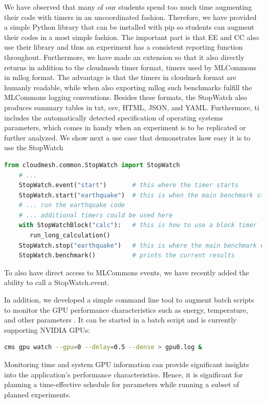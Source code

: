 \documentclass[utf8]{FrontiersinVancouver} %
\begin{document}
We have observed that many of our students spend too much time augmenting their code with timers in an uncoordinated fashion. Therefore, we have provided a simple Python library that can be installed with pip so students can augment their codes in a most simple fashion. The important part is that EE and CC also use their library and thus an experiment has a consistent reporting function throughout.  Furthermore, we have made an extension so that it also directly returns in addition to the cloudmesh timer format, timers used by MLCommons in mllog format. The advantage is that the timers in cloudmeh format are humanly readable, while when also exporting mllog such benchmarks fulfill the MLCommons logging conventions. Besides these formats, the StopWatch also produces summary tables in txt, csv, HTML, JSON, and YAML. Furthermore, ti includes the automatically detected specification of operating systems parameters, which comes in handy when an experiment is to be replicated or further analyzed.
We show next  a use case that demonstrates how easy it is to use the StopWatch


\begin{lstlisting}[language=Python]
    from cloudmesh.common.StopWatch import StopWatch 
    # ...
    StopWatch.event("start")       # this where the timer starts
    StopWatch.start("earthquake")  # this is when the main benchmark starts
    # ... run the earthquake code
    # ... additional timers could be used here
    with StopWatchBlock("calc"):   # this is how to use a block timer
       run_long_calculation()
    StopWatch.stop("earthquake")   # this is where the main benchmark ends
    StopWatch.benchmark()          # prints the current results
\end{lstlisting}

To also have direct access to MLCommons events, we have recently added the ability to call a StopWatch.event.

In addition, we developed a simple command line tool to augment batch scripts to monitor the GPU performance characteristics such as energy, temperature, and other parameters \citep{cloudmesh-gpu}. It  can be started in a batch script and is currently supporting NVIDIA GPUs:


\begin{lstlisting}[language=sh]
    cms gpu watch --gpu=0 --delay=0.5 --dense > gpu0.log &
\end{lstlisting}


Monitoring time and system GPU information can provide significant insights into the application's performance characteristics. Hence, it is significant for planning a time-effective schedule for parameters while running a subset of planned experiments.
\end{document}
